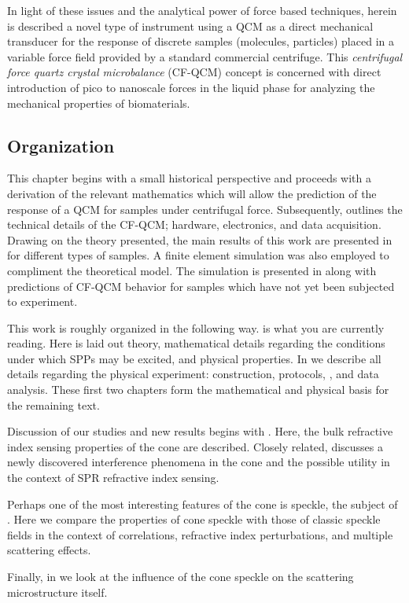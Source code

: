 In light of these issues and the analytical power of force based
techniques, herein is described a novel type of instrument using a QCM as a
direct mechanical transducer for the response of discrete samples
(molecules, particles) placed in a variable force field provided by a
standard commercial centrifuge.  This \textit{centrifugal force quartz
crystal microbalance} (CF-QCM) concept is concerned with direct
introduction of pico to nanoscale forces in the liquid phase for analyzing
the mechanical properties of biomaterials.

\subsection{Organization}
This chapter begins with a small historical perspective and proceeds
with a derivation of the relevant mathematics which will allow the
prediction of the response of a QCM for samples under centrifugal force.
Subsequently,  outlines the technical details of the
CF-QCM; hardware, electronics, and data acquisition.  Drawing on the theory
presented, the main results of this work are presented in
 for different types of samples.  A
finite element simulation was also employed to compliment the
theoretical model.  The simulation is presented in
 along with predictions of CF-QCM behavior for
samples which have not yet been subjected to experiment.

This work is roughly organized in the following way.
 is what you are currently reading.  Here is laid out
theory, mathematical details regarding the conditions under which SPPs may
be excited, and physical properties.  In  we
describe all details regarding the physical experiment: construction,
protocols, , and data analysis.  These first two chapters form the
mathematical and physical basis for the remaining text.

Discussion of our studies and new results begins with .
Here, the bulk refractive index sensing properties of the cone are
described.  Closely related,  discusses a newly
discovered interference phenomena in the cone and the possible utility in
the context of SPR refractive index sensing.

Perhaps one of the most interesting features of the cone is speckle, the
subject of .  Here we compare the properties of cone
speckle with those of classic speckle fields in the context of
correlations, refractive index perturbations, and multiple scattering
effects.

Finally, in  we look at the influence of the
cone speckle on the scattering microstructure itself.


